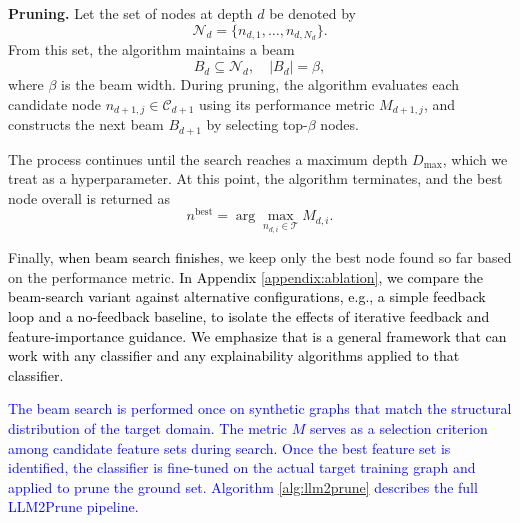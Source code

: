 

\textbf{Pruning.} Let the set of nodes at depth $d$ be denoted by
\[
\mathcal{N}_d = \{ n_{d,1}, \dots, n_{d,N_d} \}.
\]
From this set, the algorithm maintains a beam
\[
B_d \subseteq \mathcal{N}_d, \quad |B_d| = \beta,
\]
where $\beta$ is the beam width.  During pruning, the algorithm evaluates each candidate node $n_{d+1,j} \in \mathcal{C}_{d+1}$ using its performance metric $M_{d+1,j}$, and constructs the next beam $B_{d+1}$ by selecting top-$\beta$ nodes.



The process continues until the search reaches a maximum depth $D_{\max}$, which we treat as a hyperparameter. At this point, the algorithm terminates, and the best node overall is returned as
\[
n^{\mathrm{best}} = \arg\max_{n_{d,i} \in \mathcal{T}} M_{d,i}.
\]

Finally, \textcolor{black}{when beam search finishes}, we keep only the best node found so far based on the performance metric. \textcolor{black}{In Appendix \ref{appendix:ablation}, we compare the beam-search variant against alternative configurations, e.g., a simple feedback loop and a no-feedback baseline, to isolate the effects of iterative feedback and feature-importance guidance.} \textcolor{black}{ We emphasize that \llm is a general framework that can work with any classifier and any explainability algorithms applied to that classifier.}

\textcolor{blue}{The beam search is performed once on synthetic graphs that match the structural distribution of the target domain. The metric $M$ serves as a selection criterion among candidate feature sets during search. Once the best feature set is identified, the classifier is fine-tuned on the actual target training graph and applied to prune the ground set. Algorithm \ref{alg:llm2prune} describes the full LLM2Prune pipeline.}

